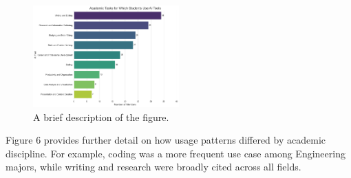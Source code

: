 \documentclass[12pt]{article}
\begin{document}
\begin{figure}[htbp]
  \centering
  \includegraphics[width=0.5\textwidth]{fig5.png} %
  \caption{A brief description of the figure.}
  \label{fig:example1}
\end{figure}

Figure 6 provides further detail on how usage patterns differed by academic discipline. For example, coding was a more frequent use case among Engineering majors, while writing and research were broadly cited across all fields.
\end{document}
